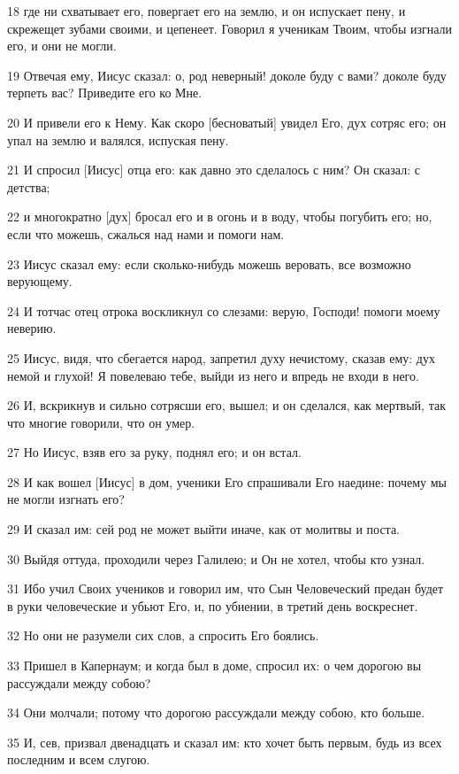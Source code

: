 \par 18 где ни схватывает его, повергает его на землю, и он испускает пену, и скрежещет зубами своими, и цепенеет. Говорил я ученикам Твоим, чтобы изгнали его, и они не могли.
\par 19 Отвечая ему, Иисус сказал: о, род неверный! доколе буду с вами? доколе буду терпеть вас? Приведите его ко Мне.
\par 20 И привели его к Нему. Как скоро [бесноватый] увидел Его, дух сотряс его; он упал на землю и валялся, испуская пену.
\par 21 И спросил [Иисус] отца его: как давно это сделалось с ним? Он сказал: с детства;
\par 22 и многократно [дух] бросал его и в огонь и в воду, чтобы погубить его; но, если что можешь, сжалься над нами и помоги нам.
\par 23 Иисус сказал ему: если сколько-нибудь можешь веровать, все возможно верующему.
\par 24 И тотчас отец отрока воскликнул со слезами: верую, Господи! помоги моему неверию.
\par 25 Иисус, видя, что сбегается народ, запретил духу нечистому, сказав ему: дух немой и глухой! Я повелеваю тебе, выйди из него и впредь не входи в него.
\par 26 И, вскрикнув и сильно сотрясши его, вышел; и он сделался, как мертвый, так что многие говорили, что он умер.
\par 27 Но Иисус, взяв его за руку, поднял его; и он встал.
\par 28 И как вошел [Иисус] в дом, ученики Его спрашивали Его наедине: почему мы не могли изгнать его?
\par 29 И сказал им: сей род не может выйти иначе, как от молитвы и поста.
\par 30 Выйдя оттуда, проходили через Галилею; и Он не хотел, чтобы кто узнал.
\par 31 Ибо учил Своих учеников и говорил им, что Сын Человеческий предан будет в руки человеческие и убьют Его, и, по убиении, в третий день воскреснет.
\par 32 Но они не разумели сих слов, а спросить Его боялись.
\par 33 Пришел в Капернаум; и когда был в доме, спросил их: о чем дорогою вы рассуждали между собою?
\par 34 Они молчали; потому что дорогою рассуждали между собою, кто больше.
\par 35 И, сев, призвал двенадцать и сказал им: кто хочет быть первым, будь из всех последним и всем слугою.
